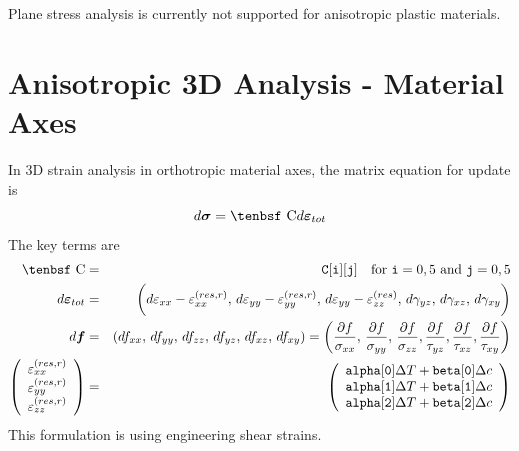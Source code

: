 \documentclass[11pt]{book}
\renewcommand{\vec}[1]{\boldsymbol{#1}}
\def\C{\hbox{\tenbsf C}}
\def\code#1{{\small\tt #1}}
\def\deff{d \vec{\varepsilon}_{tot}}
\def\df{d \vec{f}}
\def\dsig{d \vec{\sigma}}
\def\DT{\Delta T}
\def\e#1{\varepsilon_{#1}}
\def\er#1{\varepsilon_{#1}^{(res)}}
\def\err#1{\varepsilon_{#1}^{(res,r)}}
\def\g#1{\gamma_{#1}}
\begin{document}
Plane stress analysis is currently not supported for anisotropic plastic materials.

\section{Anisotropic 3D Analysis - Material Axes}

In 3D strain analysis in orthotropic material axes, the matrix equation for update is
\begin{equation}
    \dsig = \C \deff 
\end{equation}
The key terms are
\begin{eqnarray}
      \C & = & \code{C[i][j]} \quad {\rm for\ }\code{i}=0,5\ {\rm and\ }\code{j}=0,5 \\
       \deff & = & \biggl(d\e{xx} - \err{xx}, \thinspace d\e{yy} - \err{yy}, \thinspace  d\e{yy}-  \er{zz}, 
             \thinspace d\g{yz}, \thinspace d\g{xz},  \thinspace d\g{xy}\biggr) \\
      \df & = & (df_{xx}, \thinspace df_{yy}, \thinspace df_{zz}, \thinspace df_{yz}, \thinspace df_{xz}, \thinspace df_{xy})
                  = \left({\partial f\over \sigma_{xx}}, \thinspace {\partial f\over \sigma_{yy}}, \thinspace {\partial f\over \sigma_{zz}},
                                {\partial f\over \tau_{yz}}, {\partial f\over \tau_{xz}}, {\partial f\over \tau_{xy}}\right)  \\
\left(\begin{array}{c} \err{xx} \\ \err{yy} \\ \err{zz}  \end{array}\right)
       & = &  \left(\begin{array}{c}
	\code{alpha[0]}\DT + \code{beta[0]}\Delta c \\
	\code{alpha[1]}\DT + \code{beta[1]}\Delta c \\
	\code{alpha[2]}\DT + \code{beta[2]}\Delta c \\
 \end{array}\right) 
 \end{eqnarray}
This formulation is using engineering shear strains. 
 
\end{document}
